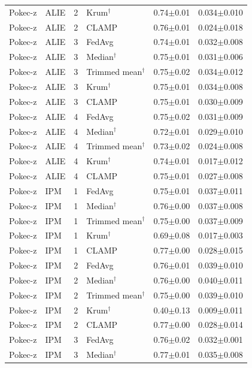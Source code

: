 \begin{longtable}{llclcc}
Pokec-z & ALIE & 2 & Krum$^\dagger$ & 0.74$\pm$0.01 & 0.034$\pm$0.010 \\
Pokec-z & ALIE & 2 & CLAMP & 0.76$\pm$0.01 & 0.024$\pm$0.018 \\
Pokec-z & ALIE & 3 & FedAvg & 0.74$\pm$0.01 & 0.032$\pm$0.008 \\
Pokec-z & ALIE & 3 & Median$^\dagger$ & 0.75$\pm$0.01 & 0.031$\pm$0.006 \\
Pokec-z & ALIE & 3 & Trimmed mean$^\dagger$ & 0.75$\pm$0.02 & 0.034$\pm$0.012 \\
Pokec-z & ALIE & 3 & Krum$^\dagger$ & 0.75$\pm$0.01 & 0.034$\pm$0.008 \\
Pokec-z & ALIE & 3 & CLAMP & 0.75$\pm$0.01 & 0.030$\pm$0.009 \\
Pokec-z & ALIE & 4 & FedAvg & 0.75$\pm$0.02 & 0.031$\pm$0.009 \\
Pokec-z & ALIE & 4 & Median$^\dagger$ & 0.72$\pm$0.01 & 0.029$\pm$0.010 \\
Pokec-z & ALIE & 4 & Trimmed mean$^\dagger$ & 0.73$\pm$0.02 & 0.024$\pm$0.008 \\
Pokec-z & ALIE & 4 & Krum$^\dagger$ & 0.74$\pm$0.01 & 0.017$\pm$0.012 \\
Pokec-z & ALIE & 4 & CLAMP & 0.75$\pm$0.01 & 0.027$\pm$0.008 \\
Pokec-z & IPM & 1 & FedAvg & 0.75$\pm$0.01 & 0.037$\pm$0.011 \\
Pokec-z & IPM & 1 & Median$^\dagger$ & 0.76$\pm$0.00 & 0.037$\pm$0.008 \\
Pokec-z & IPM & 1 & Trimmed mean$^\dagger$ & 0.75$\pm$0.00 & 0.037$\pm$0.009 \\
Pokec-z & IPM & 1 & Krum$^\dagger$ & 0.69$\pm$0.08 & 0.017$\pm$0.003 \\
Pokec-z & IPM & 1 & CLAMP & 0.77$\pm$0.00 & 0.028$\pm$0.015 \\
Pokec-z & IPM & 2 & FedAvg & 0.76$\pm$0.01 & 0.039$\pm$0.010 \\
Pokec-z & IPM & 2 & Median$^\dagger$ & 0.76$\pm$0.00 & 0.040$\pm$0.011 \\
Pokec-z & IPM & 2 & Trimmed mean$^\dagger$ & 0.75$\pm$0.00 & 0.039$\pm$0.010 \\
Pokec-z & IPM & 2 & Krum$^\dagger$ & 0.40$\pm$0.13 & 0.009$\pm$0.011 \\
Pokec-z & IPM & 2 & CLAMP & 0.77$\pm$0.00 & 0.028$\pm$0.014 \\
Pokec-z & IPM & 3 & FedAvg & 0.76$\pm$0.02 & 0.032$\pm$0.001 \\
Pokec-z & IPM & 3 & Median$^\dagger$ & 0.77$\pm$0.01 & 0.035$\pm$0.008 \\

\end{longtable}
